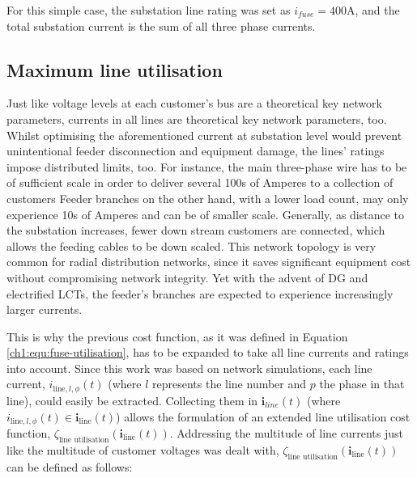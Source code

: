

For this simple case, the substation line rating was set as $i_{fuse}=400\text{A}$, and the total substation current is the sum of all three phase currents.

\subsection{Maximum line utilisation}
\label{ch1:subsec:maximum-line-utilisation}

Just like voltage levels at each customer's bus are a theoretical key network parameters, currents in all lines are theoretical key network parameters, too.
Whilst optimising the aforementioned current at substation level would prevent unintentional feeder disconnection and equipment damage, the lines' ratings impose distributed limits, too.
For instance, the main three-phase wire has to be of sufficient scale in order to deliver several 100s of Amperes to a collection of customers
Feeder branches on the other hand, with a lower load count, may only experience 10s of Amperes and can be of smaller scale.
Generally, as distance to the substation increases, fewer down stream customers are connected, which allows the feeding cables to be down scaled.
This network topology is very common for radial distribution networks, since it saves significant equipment cost without compromising network integrity.
Yet with the advent of DG and electrified LCTs, the feeder's branches are expected to experience increasingly larger currents.


This is why the previous cost function, as it was defined in Equation \ref{ch1:equ:fuse-utilisation}, has to be expanded to take all line currents and ratings into account.
Since this work was based on network simulations, each line current, $i_{\text{line},l,\phi}(t)$ (where $l$ represents the line number and $p$ the phase in that line), could easily be extracted.
Collecting them in $\textbf{i}_{line}(t)$ (where $i_{\text{line},l,\phi}(t) \in \textbf{i}_\text{line}(t)$) allows the formulation of an extended line utilisation cost function, $\zeta_\text{line utilisation}(\textbf{i}_\text{line}(t))$.
Addressing the multitude of line currents just like the multitude of customer voltages was dealt with, $\zeta_\text{line utilisation}(\textbf{i}_\text{line}(t))$ can be defined as follows:


